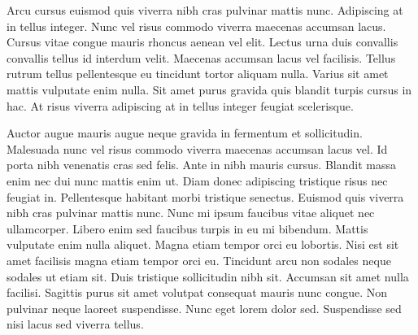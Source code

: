 Arcu cursus euismod quis viverra nibh cras pulvinar mattis nunc. Adipiscing at in tellus integer. Nunc vel risus commodo viverra maecenas accumsan lacus. Cursus vitae congue mauris rhoncus aenean vel elit. Lectus urna duis convallis convallis tellus id interdum velit. Maecenas accumsan lacus vel facilisis. Tellus rutrum tellus pellentesque eu tincidunt tortor aliquam nulla. Varius sit amet mattis vulputate enim nulla. Sit amet purus gravida quis blandit turpis cursus in hac. At risus viverra adipiscing at in tellus integer feugiat scelerisque.

Auctor augue mauris augue neque gravida in fermentum et sollicitudin. Malesuada nunc vel risus commodo viverra maecenas accumsan lacus vel. Id porta nibh venenatis cras sed felis. Ante in nibh mauris cursus. Blandit massa enim nec dui nunc mattis enim ut. Diam donec adipiscing tristique risus nec feugiat in. Pellentesque habitant morbi tristique senectus. Euismod quis viverra nibh cras pulvinar mattis nunc. Nunc mi ipsum faucibus vitae aliquet nec ullamcorper. Libero enim sed faucibus turpis in eu mi bibendum. Mattis vulputate enim nulla aliquet. Magna etiam tempor orci eu lobortis. Nisi est sit amet facilisis magna etiam tempor orci eu. Tincidunt arcu non sodales neque sodales ut etiam sit. Duis tristique sollicitudin nibh sit. Accumsan sit amet nulla facilisi. Sagittis purus sit amet volutpat consequat mauris nunc congue. Non pulvinar neque laoreet suspendisse. Nunc eget lorem dolor sed. Suspendisse sed nisi lacus sed viverra tellus.
